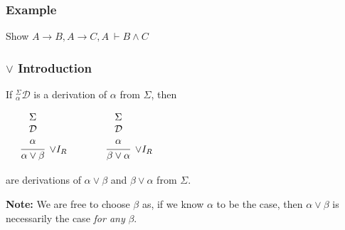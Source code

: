 \documentclass{beamer}
\theoremstyle{indentDefn} \newtheorem{defn}[]{Definition}
\begin{document}
\begin{frame}
	\frametitle{Example}

	Show $A \to B, A \to C, A \ \vdash B \land C$
	
	\vspace{6cm}

\end{frame}

\begin{frame}
	\frametitle{$\lor$ Introduction}
	
	If $^{\Sigma}_{\alpha}\mathcal{D}$ is a derivation of $\alpha$ from $\Sigma$, then 
	
	\begin{center}
		
	$\begin{array}{ c c c }	
		\begin{array}{ c c }		
			\begin{array}{c}		
				\infer[\lor I_{R}]{\alpha \lor \beta}
				{\begin{array}{c} \Sigma \\ \mathcal{D} \\ \alpha \end{array}}
			\end{array}
		\end{array}
		
		&
		
		&
		
		\begin{array}{ c c }		
			\begin{array}{c}		
				\infer[\lor I_{R}]{\beta \lor \alpha}
				{\begin{array}{c} \Sigma \\ \mathcal{D} \\ \alpha \end{array}}
			\end{array}
		\end{array}		
		
		
	\end{array}$
	\end{center}
	
	are derivations of $\alpha \lor \beta$ and $\beta \lor \alpha$ from $\Sigma$. 
	
	\vspace{1cm}
	
	{\bf Note:} We are free to choose $\beta$ as, if we know $\alpha$ to be the case, then $\alpha \lor \beta$  is necessarily the case \emph{for any }$\beta$. 
	
\end{frame}
\end{document}
